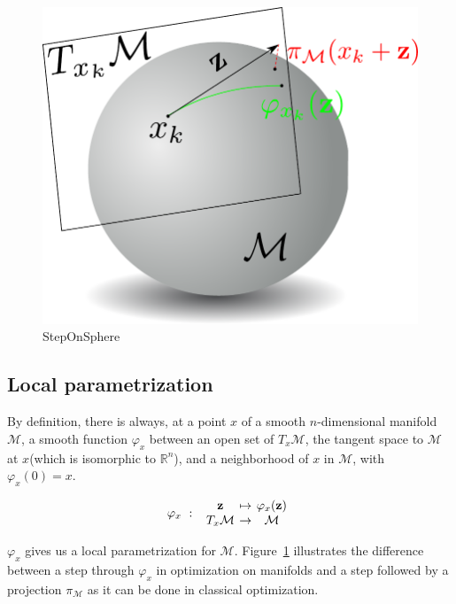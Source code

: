 \begin{figure}[htpb]
  \centering
  \includegraphics[width=0.5\linewidth]{Humanoids2015/stepOnSphere.pdf}
  \caption{StepOnSphere}
\label{fig:stepOnSphere}
\end{figure}


\subsection{Local parametrization}
By definition, there is always, at a point $x$ of a smooth $n$-dimensional manifold $\mathcal{M}$, a smooth function $\varphi_x$ between an open set of $T_x\mathcal{M}$, the tangent space to $\mathcal{M}$ at $x$(which is isomorphic to $\mathbb{R}^n$), and a neighborhood of $x$ in $\mathcal{M}$, with $\varphi_x(0) = x$.

\begin{equation}
  \varphi_x\ :\
  \begin{array}{ccc}
    \mathbf{z} & \reduce{\mapsto}{6} & \varphi_x(\mathbf{z}) \\
    T_x\mathcal{M} & \reduce{\rightarrow}{6} & \mathcal{M}
  \end{array} \nonumber%
\end{equation}

$\varphi_x$ gives us a local parametrization for $\mathcal{M}$.
Figure~\ref{fig:stepOnSphere} illustrates the difference between a step through $\varphi_x$ in optimization on manifolds and a step followed by a projection $\pi_\mathcal{M}$ as it can be done in classical optimization.

